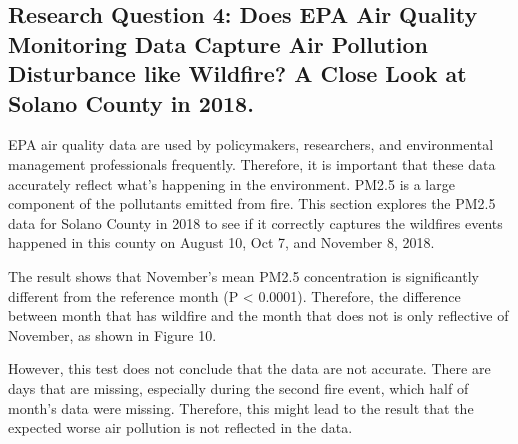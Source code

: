 \documentclass[12pt,]{article}
\newenvironment{Shaded}{\begin{snugshade}}{\end{snugshade}}
\newcommand{\KeywordTok}[1]{\textcolor[rgb]{0.13,0.29,0.53}{\textbf{#1}}}
\newcommand{\DecValTok}[1]{\textcolor[rgb]{0.00,0.00,0.81}{#1}}
\newcommand{\FloatTok}[1]{\textcolor[rgb]{0.00,0.00,0.81}{#1}}
\newcommand{\StringTok}[1]{\textcolor[rgb]{0.31,0.60,0.02}{#1}}
\newcommand{\CommentTok}[1]{\textcolor[rgb]{0.56,0.35,0.01}{\textit{#1}}}
\newcommand{\OperatorTok}[1]{\textcolor[rgb]{0.81,0.36,0.00}{\textbf{#1}}}
\newcommand{\NormalTok}[1]{#1}
\begin{document}
\newpage

\subsection{Research Question 4: Does EPA Air Quality Monitoring Data
Capture Air Pollution Disturbance like Wildfire? A Close Look at Solano
County in
2018.}\label{research-question-4-does-epa-air-quality-monitoring-data-capture-air-pollution-disturbance-like-wildfire-a-close-look-at-solano-county-in-2018.}

EPA air quality data are used by policymakers, researchers, and
environmental management professionals frequently. Therefore, it is
important that these data accurately reflect what's happening in the
environment. PM2.5 is a large component of the pollutants emitted from
fire. This section explores the PM2.5 data for Solano County in 2018 to
see if it correctly captures the wildfires events happened in this
county on August 10, Oct 7, and November 8, 2018.

\begin{Shaded}
\end{Shaded}

The result shows that November's mean PM2.5 concentration is
significantly different from the reference month (P \textless{} 0.0001).
Therefore, the difference between month that has wildfire and the month
that does not is only reflective of November, as shown in Figure 10.

However, this test does not conclude that the data are not accurate.
There are days that are missing, especially during the second fire
event, which half of month's data were missing. Therefore, this might
lead to the result that the expected worse air pollution is not
reflected in the data.
\end{document}
